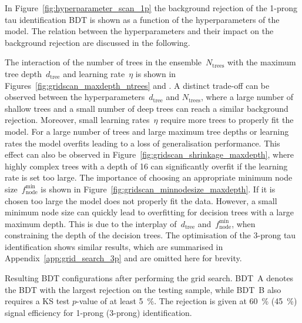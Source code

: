 In Figure~\ref{fig:hyperparameter_scan_1p} the background rejection of the
1-prong tau identification BDT is shown as a function of the hyperparameters of
the model. The relation between the hyperparameters and their impact on the
background rejection are discussed in the following.

The interaction of the number of trees in the ensemble~$N_\text{trees}$ with the
maximum tree depth~$d_\text{tree}$ and learning rate~$\eta$ is shown in
Figures~\ref{fig:gridscan_maxdepth_ntrees} and
. A distinct trade-off can be observed
between the hyperparameters~$d_\text{tree}$ and $N_\text{trees}$, where a large
number of shallow trees and a small number of deep trees can reach a similar
background rejection. Moreover, small learning rates~$\eta$ require more trees
to properly fit the model. For a large number of trees and large maximum tree
depths or learning rates the model overfits leading to a loss of generalisation
performance. This effect can also be observed in
Figure~\ref{fig:gridscan_shrinkage_maxdepth}, where highly complex trees with a
depth of 16 can significantly overfit if the learning rate is set too large. The
importance of choosing an appropriate minimum node
size~$f_\text{node}^\text{min}$ is shown in
Figure~\ref{fig:gridscan_minnodesize_maxdepth}. If it is chosen too large the
model does not properly fit the data. However, a small minimum node size can
quickly lead to overfitting for decision trees with a large maximum depth. This
is due to the interplay of~$d_\text{tree}$ and~$f_\text{node}^\text{min}$, when
constraining the depth of the decision trees. The optimisation of the 3-prong
tau identification shows similar results, which are summarised in
Appendix~\ref{app:grid_search_3p} and are omitted here for brevity.

\begin{table}[htb]
  \centering
  {\small}
  \caption{Resulting BDT configurations after performing the grid search. BDT~A
    denotes the BDT with the largest rejection on the testing sample, while
    BDT~B also requires a KS test $p$-value of at least \SI{5}{\percent}. The
    rejection is given at \SI{60}{\percent} (\SI{45}{\percent}) signal
    efficiency for 1-prong (3-prong) identification.}
  \label{tab:bdt_perfs}
\end{table}

